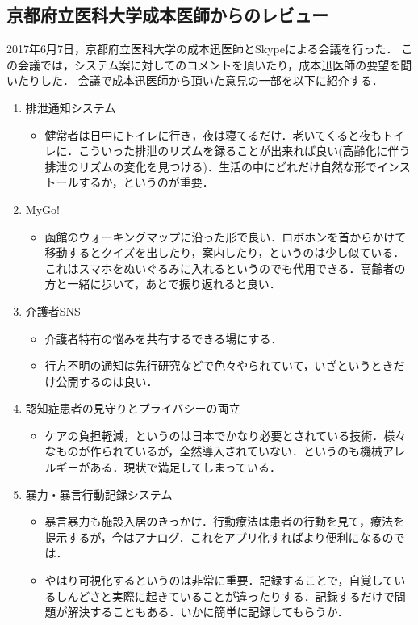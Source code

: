 \documentclass[../report]{subfiles}
\begin{document}
\subsection{京都府立医科大学成本医師からのレビュー}
2017年6月7日，京都府立医科大学の成本迅医師とSkypeによる会議を行った．
この会議では，システム案に対してのコメントを頂いたり，成本迅医師の要望を聞いたりした．
会議で成本迅医師から頂いた意見の一部を以下に紹介する．
\begin{enumerate}
    \item 排泄通知システム
        \begin{itemize}
            \item 健常者は日中にトイレに行き，夜は寝てるだけ．老いてくると夜もトイレに．こういった排泄のリズムを録ることが出来れば良い(高齢化に伴う排泄のリズムの変化を見つける)．生活の中にどれだけ自然な形でインストールするか，というのが重要．
        \end{itemize}
    \item MyGo!
        \begin{itemize}
            \item 函館のウォーキングマップに沿った形で良い．ロボホンを首からかけて移動するとクイズを出したり，案内したり，というのは少し似ている．これはスマホをぬいぐるみに入れるというのでも代用できる．高齢者の方と一緒に歩いて，あとで振り返れると良い．
        \end{itemize}
    \item 介護者SNS
        \begin{itemize}
            \item 介護者特有の悩みを共有するできる場にする．
            \item 行方不明の通知は先行研究などで色々やられていて，いざというときだけ公開するのは良い．
        \end{itemize}
    \item 認知症患者の見守りとプライバシーの両立
        \begin{itemize}
            \item ケアの負担軽減，というのは日本でかなり必要とされている技術．様々なものが作られているが，全然導入されていない．というのも機械アレルギーがある．現状で満足してしまっている．
        \end{itemize}
    \item 暴力・暴言行動記録システム
        \begin{itemize}
            \item 暴言暴力も施設入居のきっかけ．行動療法は患者の行動を見て，療法を提示するが，今はアナログ．これをアプリ化すればより便利になるのでは．
            \item やはり可視化するというのは非常に重要．記録することで，自覚しているしんどさと実際に起きていることが違ったりする．記録するだけで問題が解決することもある．いかに簡単に記録してもらうか．
        \end{itemize}
\end{enumerate}
\end{document}
